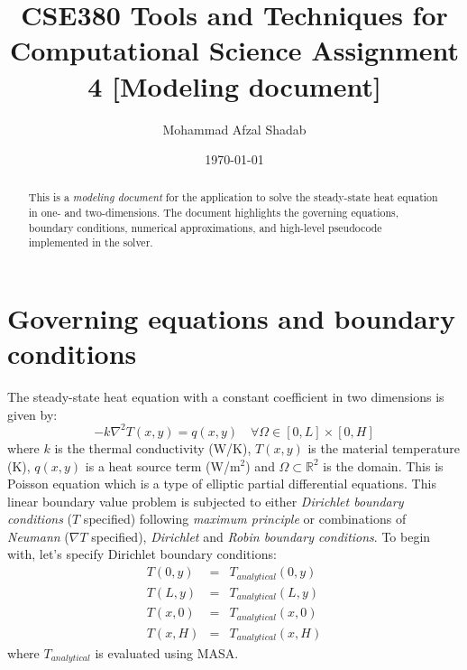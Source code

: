 \documentclass[12pt]{amsart}   %
\begin{document}
\title[CSE380 Assignment 4]{CSE380 Tools and Techniques for Computational Science Assignment 4 
[Modeling document]} 
 
\author{Mohammad Afzal Shadab}
\date{\today}              %


\newcommand{\C}{\mathbb C} %
\newcommand{\R}{\mathbb R} 
\newcommand{\Z}{\mathbb Z}
\newcommand{\Q}{\mathbb Q}
\newcommand{\N}{\mathbb N}

\begin{abstract}
This is a \textit{modeling document} for the application to solve the steady-state heat equation in one- and two-dimensions. The document highlights the governing equations, boundary conditions, numerical approximations, and high-level pseudocode implemented in the solver.  
\end{abstract}

\maketitle

\section{Governing equations and boundary conditions\label{sec:goveqn}}
The steady-state heat equation with a constant coefficient in two dimensions is given by:
\begin{equation} \label{eq:1}
    \boxed{-k \nabla^2T(x,y) = q(x,y) \quad \forall \Omega\in[0,L]\times[0,H]}
\end{equation}
where $k$ is the thermal conductivity (W/K), $T(x,y)$ is the material temperature (K), $q(x,y)$ is a heat source term (W/m$^2$) and $\Omega \subset \mathbb{R}^2$ is the domain. This is Poisson equation which is a type of elliptic partial differential equations. This linear boundary value problem is subjected to either \textit{Dirichlet boundary conditions} ($T$ specified) following \textit{maximum principle} or combinations of \textit{Neumann} ($\nabla T$ specified), \textit{Dirichlet} and \textit{Robin boundary conditions}. To begin with, let's specify Dirichlet boundary conditions:
\begin{eqnarray}
T(0,y) &=& T_{analytical}(0,y) \nonumber\\
T(L,y) &=& T_{analytical}(L,y)\\
T(x,0) &=& T_{analytical}(x,0)\nonumber\\
T(x,H) &=& T_{analytical}(x,H)\nonumber
\end{eqnarray}
where $T_{analytical}$ is evaluated using MASA.
\end{document}
